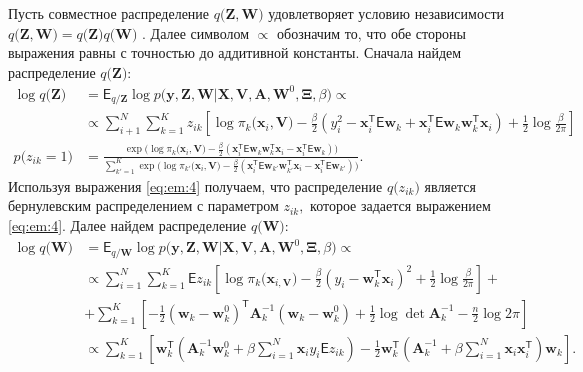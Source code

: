 Пусть совместное распределение $q\bigr(\mathbf{Z}, \mathbf{W}\bigr)$ удовлетворяет условию независимости $q\bigr(\mathbf{Z}, \mathbf{W}\bigr) = q\bigr(\mathbf{Z}\bigr)q\bigr(\mathbf{W}\bigr)$ \cite{bishop2006}. 
Далее символом $\propto$ обозначим то, что обе стороны выражения равны с точностью до аддитивной константы.
Сначала найдем распределение $q\bigr(\textbf{Z}\bigr)$:
\[
\label{eq:em:4}
\begin{aligned}
\log q\bigr(\textbf{Z}\bigr) &= \mathsf{E}_{q/\textbf{Z}} \log p\bigr(\mathbf{y}, \mathbf{Z}, \mathbf{W}|\mathbf{X}, \mathbf{V}, \textbf{A}, \textbf{W}^{0}, \bm{\Xi}, \beta\bigr)  \propto\\
&\propto \sum_{i+1}^{N}\sum_{k=1}^{K}z_{ik}\left[\log\pi_{k}\bigr(\textbf{x}_{i}, \textbf{V}\bigr) - \frac{\beta}{2}\left(y_{i}^{2} -\textbf{x}_{i}^{\mathsf{T}}\mathsf{E}\textbf{w}_{k} + \textbf{x}_{i}^{\mathsf{T}}\mathsf{E}\textbf{w}_{k}\textbf{w}_{k}^{\mathsf{T}}\textbf{x}_{i}\right) + \frac{1}{2}\log\frac{\beta}{2\pi}\right]\\
p\bigr(z_{ik} = 1\bigr) &= \frac{\exp\bigr(\log\pi_{k}\bigr(\textbf{x}_{i}, \textbf{V}\bigr) - \frac{\beta}{2}\left(\textbf{x}_{i}^{\mathsf{T}}\mathsf{E}\textbf{w}_{k}\textbf{w}_{k}^{\mathsf{T}}\textbf{x}_{i} - \textbf{x}_{i}^{\mathsf{T}}\mathsf{E}\textbf{w}_{k}\right)\bigr)}{\sum_{k'=1}^{K}\exp\bigr(\log\pi_{k'}\bigr(\textbf{x}_{i}, \textbf{V}\bigr) - \frac{\beta}{2}\left(\textbf{x}_{i}^{\mathsf{T}}\mathsf{E}\textbf{w}_{k'}\textbf{w}_{k'}^{\mathsf{T}}\textbf{x}_{i} - \textbf{x}_{i}^{\mathsf{T}}\mathsf{E}\textbf{w}_{k'}\right)\bigr)}.
\end{aligned}
\]
Используя выражения \eqref{eq:em:4} получаем, что распределение $q\bigr(z_{ik}\bigr)$ является бернулевским распределением с параметром $z_{ik},$ которое задается выражением \eqref{eq:em:4}.
Далее найдем распределение $q\bigr(\textbf{W}\bigr)$:
\[
\label{eq:em:5}
\begin{aligned}
\log q\bigr(\textbf{W}\bigr) &= \mathsf{E}_{q/\textbf{W}}\log p\bigr(\mathbf{y}, \mathbf{Z}, \mathbf{W}|\mathbf{X}, \mathbf{V}, \textbf{A}, \textbf{W}^{0}, \bm{\Xi}, \beta\bigr) \propto\\
&\propto \sum_{i=1}^{N}\sum_{k=1}^{K}\mathsf{E}z_{ik}\left[\log\pi_{k}\bigr(\textbf{x}_{i, \textbf{V}}\bigr) - \frac{\beta}{2}\left(y_{i} - \textbf{w}_{k}^{\mathsf{T}}\textbf{x}_{i}\right)^{2} + \frac{1}{2}\log\frac{\beta}{2\pi}\right] + \\
&+ \sum_{k=1}^{K}\left[-\frac{1}{2}\left(\textbf{w}_{k} - \textbf{w}_{k}^{0}\right)^{\mathsf{T}}\textbf{A}_{k}^{-1}\left(\textbf{w}_{k} - \textbf{w}_{k}^{0}\right) + \frac{1}{2}\log\det\textbf{A}^{-1}_{k} - \frac{n}{2}\log2\pi\right] \\
&\propto \sum_{k=1}^{K}\left[\textbf{w}_{k}^{\mathsf{T}}\left(\textbf{A}_{k}^{-1}\textbf{w}_{k}^{0}+\beta\sum_{i=1}^{N}\textbf{x}_{i}y_{i}\mathsf{E}z_{ik}\right)-\frac{1}{2}\textbf{w}_{k}^{\mathsf{T}}\left(\textbf{A}_{k}^{-1}+\beta\sum_{i=1}^{N}\textbf{x}_{i}\textbf{x}_{i}^{\mathsf{T}}\right)\textbf{w}_{k}\right].
\end{aligned}
\]
